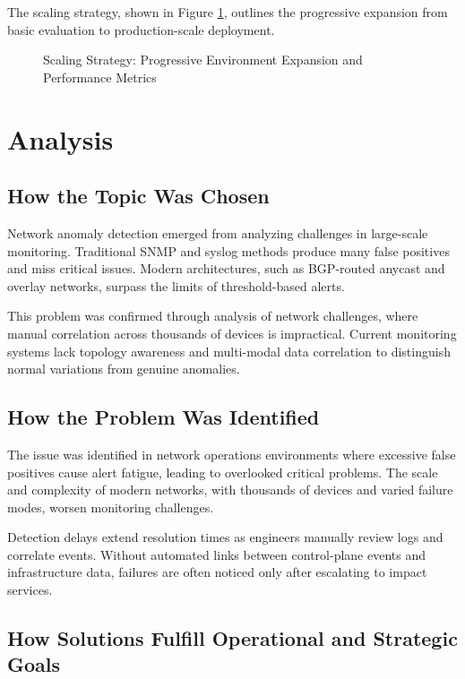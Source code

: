 \documentclass[11pt]{article}
\begin{document}
The scaling strategy, shown in Figure \ref{fig:scaling}, outlines the progressive expansion from basic evaluation to production-scale deployment.

\begin{figure}[h]
\centering

\caption{Scaling Strategy: Progressive Environment Expansion and Performance Metrics}
\label{fig:scaling}
\end{figure}

\section{Analysis}

\subsection{How the Topic Was Chosen}

Network anomaly detection emerged from analyzing challenges in large-scale monitoring. Traditional SNMP and syslog methods produce many false positives and miss critical issues. Modern architectures, such as BGP-routed anycast and overlay networks, surpass the limits of threshold-based alerts.

This problem was confirmed through analysis of network challenges, where manual correlation across thousands of devices is impractical. Current monitoring systems lack topology awareness and multi-modal data correlation to distinguish normal variations from genuine anomalies.

\subsection{How the Problem Was Identified}

The issue was identified in network operations environments where excessive false positives cause alert fatigue, leading to overlooked critical problems. The scale and complexity of modern networks, with thousands of devices and varied failure modes, worsen monitoring challenges.

Detection delays extend resolution times as engineers manually review logs and correlate events. Without automated links between control-plane events and infrastructure data, failures are often noticed only after escalating to impact services.

\subsection{How Solutions Fulfill Operational and Strategic Goals}
\end{document}
